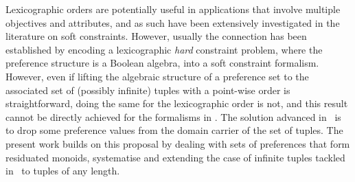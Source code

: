 \documentclass[a4paper]{elsarticle}
\newcommand{\1}{\mathbf{1}}
\begin{document}
Lexicographic orders are potentially useful in applications that involve multiple objectives and attributes,
and as such have been extensively investigated in the literature on soft constraints.
However, usually the connection has been established by encoding a lexicographic \emph{hard} constraint problem, where the preference structure is a Boolean algebra, 
into a soft constraint formalism. 
%
%
%
However, even if lifting the algebraic structure of a preference set to the associated set of (possibly infinite) tuples with a point-wise order is straightforward, 
doing the same for the lexicographic order is not, and this result cannot be directly achieved for the formalisms in \cite{jacm97,schiex}. 
%
The solution advanced in~\cite{GadducciHMW13,valuation} is to drop some preference values from the domain carrier of the set of tuples. 
%
The present work builds on
this proposal by dealing with sets of preferences that form residuated monoids, systematise and extending the case of infinite tuples tackled in~\cite{sca} 
to tuples of any length.
\end{document}
